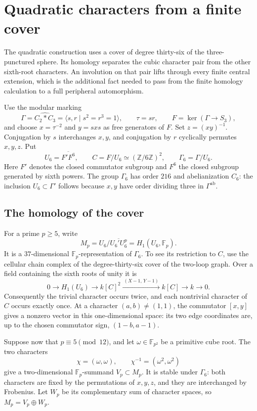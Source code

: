 \section{Quadratic characters from a finite cover}
\label{sec:quadratic-beta-characters}

The quadratic construction uses a cover of degree thirty-six of the
three-punctured sphere. Its homology separates the cubic character pair
from the other sixth-root characters. An involution on that pair lifts
through every finite central extension, which is the additional fact
needed to pass from the finite homology calculation to a full peripheral
automorphism.

Use the modular marking
\[
 \Gamma=\widehat{C_2*C_3}=\langle s,r\mid s^2=r^3=1\rangle,
 \qquad \tau=sr,
 \qquad F=\ker(\Gamma\to S_3),
\]
and choose $x=\tau^{-2}$ and $y=sxs$ as free generators of $F$.
Set $z=(xy)^{-1}$. Conjugation by $s$ interchanges $x,y$, and
conjugation by $r$ cyclically permutes $x,y,z$. Put
\[
 U_6=\overline{F'F^6},\qquad
 C=F/U_6\simeq(\mathbb Z/6\mathbb Z)^2,
 \qquad \Gamma_6=\Gamma/U_6.
\]
Here $F'$ denotes the closed commutator subgroup and $F^6$ the closed
subgroup generated by sixth powers. The group $\Gamma_6$ has order
$216$ and abelianization $C_6$: the inclusion $U_6\subset\Gamma'$
follows because $x,y$ have order dividing three in $\Gamma^{\mathrm{ab}}$.

\subsection{The homology of the cover}

For a prime $p\geq5$, write
\[
 M_p=U_6/\overline{U_6'U_6^p}=H_1(U_6,\mathbb F_p).
\]
It is a $37$-dimensional $\mathbb F_p$-representation of $\Gamma_6$.
To see its restriction to $C$, use the cellular chain complex of the
degree-thirty-six cover of the two-loop graph. Over a field containing
the sixth roots of unity it is
\[
 0\longrightarrow H_1(U_6)\longrightarrow k[C]^2
   \xrightarrow{\ (X-1,\,Y-1)\ }k[C]
   \longrightarrow k\longrightarrow0.
\]
Consequently the trivial character occurs twice, and each nontrivial
character of $C$ occurs exactly once. At a character $(a,b)\ne(1,1)$,
the commutator $[x,y]$ gives a nonzero vector in this one-dimensional
space: its two edge coordinates are, up to the chosen commutator sign,
$(1-b,a-1)$.

Suppose now that $p\equiv5\pmod{12}$, and let
$\omega\in\mathbb F_{p^2}$ be a primitive cube root. The two
characters
\[
 \chi=(\omega,\omega),\qquad
 \chi^{-1}=(\omega^2,\omega^2)
\]
give a two-dimensional $\mathbb F_p$-summand $V_p\subset M_p$.
It is stable under $\Gamma_6$: both characters are fixed by the
permutations of $x,y,z$, and they are interchanged by Frobenius.
Let $W_p$ be its complementary sum of character spaces, so
$M_p=V_p\oplus W_p$.

